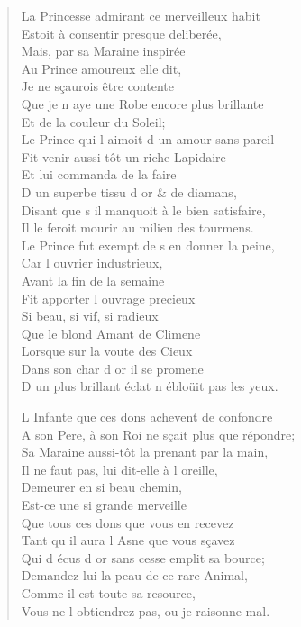 \documentclass[14pt,a4paper]{memoir}
\begin{document}
{{\begin{otherlanguage}{french}
\begin{verse}
La Princesse admirant ce merveilleux habit \\
Estoit à consentir presque deliberée, \\
\vin Mais, par sa Maraine inspirée \\
\vin Au Prince amoureux elle dit, \\
\vin Je ne sçaurois être contente \\
Que je n\textquotesingle{} aye une Robe encore plus brillante \\
\vin Et de la couleur du Soleil; \\
Le Prince qui l\textquotesingle{} aimoit d\textquotesingle{} un amour sans pareil \\
Fit venir aussi-tôt un riche Lapidaire \\
\vin Et lui commanda de la faire \\
D\textquotesingle{} un superbe tissu d\textquotesingle{} or \& de diamans, \\
Disant que s\textquotesingle{} il manquoit à le bien satisfaire, \\
Il le feroit mourir au milieu des tourmens. \\
Le Prince fut exempt de s\textquotesingle{} en donner la peine, \\
\vin Car l\textquotesingle{} ouvrier industrieux, \\
\vin Avant la fin de la semaine \\
\vin Fit apporter l\textquotesingle{} ouvrage precieux \\
\vin Si beau, si vif, si radieux \\
\vin Que le blond Amant de Climene \\
\vin Lorsque sur la voute des Cieux \\
\vin Dans son char d\textquotesingle{} or il se promene \\
D\textquotesingle{} un plus brillant éclat n\textquotesingle{} ébloüit pas les yeux.

L\textquotesingle{} Infante que ces dons achevent de confondre \\
A son Pere, à son Roi ne sçait plus que répondre; \\
Sa Maraine aussi-tôt la prenant par la main, \\
\vin Il ne faut pas, lui dit-elle à l\textquotesingle{} oreille, \\
\vin Demeurer en si beau chemin, \\
\vin Est-ce une si grande merveille \\
\vin Que tous ces dons que vous en recevez \\
\vin Tant qu\textquotesingle{} il aura l\textquotesingle{} Asne que vous sçavez \\
\vin Qui d\textquotesingle{} écus d\textquotesingle{} or sans cesse emplit sa bource; \\
Demandez-lui la peau de ce rare Animal, \\
\vin Comme il est toute sa resource, \\
Vous ne l\textquotesingle{} obtiendrez pas, ou je raisonne mal.


\end{verse}
\end{otherlanguage}}}
\end{document}
